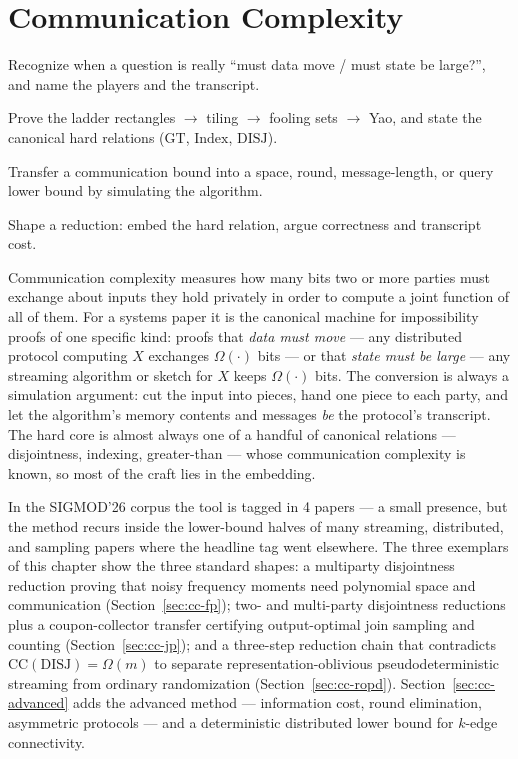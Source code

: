 \chapter{Communication Complexity}
\setcounter{section}{-1}   %
\label{ch:cc}

\begin{objectives}
\item Recognize when a question is really ``must data move / must state be large?'', and name the players and the transcript.
\item Prove the ladder rectangles $\to$ tiling $\to$ fooling sets $\to$ Yao, and state the canonical hard relations ($\mathrm{GT}$, $\mathrm{Index}$, $\mathrm{DISJ}$).
\item Transfer a communication bound into a space, round, message-length, or query lower bound by simulating the algorithm.
\item Shape a reduction: embed the hard relation, argue correctness and transcript cost.
\end{objectives}

Communication complexity measures how many bits two or more parties must exchange about
inputs they hold privately in order to compute a joint function of all of them. For a
systems paper it is the canonical machine for impossibility proofs of one specific kind:
proofs that \emph{data must move} --- any distributed protocol computing $X$ exchanges
$\Omega(\cdot)$ bits --- or that \emph{state must be large} --- any streaming algorithm or
sketch for $X$ keeps $\Omega(\cdot)$ bits. The conversion is always a simulation argument:
cut the input into pieces, hand one piece to each party, and let the algorithm's memory
contents and messages \emph{be} the protocol's transcript. The hard core is almost always
one of a handful of canonical relations --- disjointness, indexing, greater-than --- whose
communication complexity is known, so most of the craft lies in the embedding.

In the SIGMOD'26 corpus the tool is tagged in 4 papers --- a small presence, but the method
recurs inside the lower-bound halves of many streaming, distributed, and sampling papers
where the headline tag went elsewhere. The three exemplars of this chapter show the three
standard shapes: a multiparty disjointness reduction proving that noisy frequency moments
need polynomial space and communication (Section~\ref{sec:cc-fp}); two- and multi-party
disjointness reductions plus a coupon-collector transfer certifying output-optimal join
sampling and counting (Section~\ref{sec:cc-jp}); and a three-step reduction chain that
contradicts $\mathrm{CC}(\mathrm{DISJ}) = \Omega(m)$ to separate representation-oblivious
pseudodeterministic streaming from ordinary randomization (Section~\ref{sec:cc-ropd}).
Section~\ref{sec:cc-advanced} adds the advanced method --- information cost, round
elimination, asymmetric protocols --- and a deterministic distributed lower bound for
$k$-edge connectivity.

